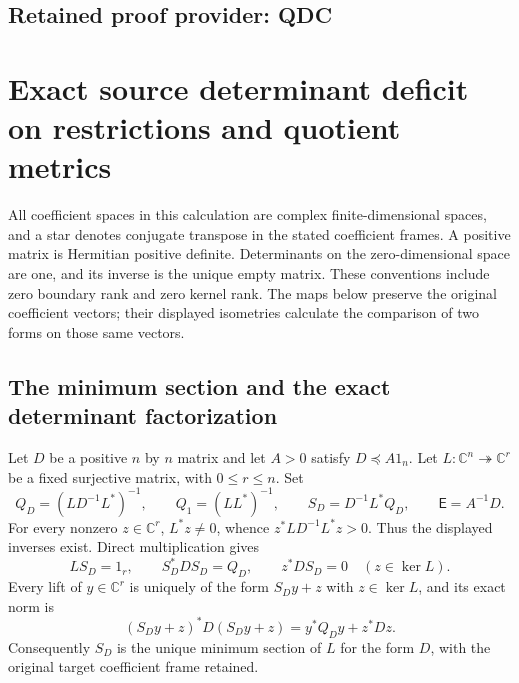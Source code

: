 \documentclass[11pt,a4paper]{article}
\begin{document}
\clearpage
\subsection*{Retained proof provider: QDC}

\section{Exact source determinant deficit on restrictions and quotient metrics}

All coefficient spaces in this calculation are complex finite-dimensional
spaces, and a star denotes conjugate transpose in the stated coefficient
frames. A positive matrix is Hermitian positive definite. Determinants on
the zero-dimensional space are one, and its inverse is the unique empty
matrix. These conventions include zero boundary rank and zero kernel rank.
The maps below preserve the original coefficient vectors; their displayed
isometries calculate the comparison of two forms on those same vectors.

\subsection{The minimum section and the exact determinant factorization}

Let $D$ be a positive $n$ by $n$ matrix and let $A>0$ satisfy
$D\preceq A1_n$. Let
$L:\mathbb C^n\twoheadrightarrow\mathbb C^r$ be a fixed surjective
matrix, with $0\le r\le n$. Set
\[
 Q_D=(LD^{-1}L^*)^{-1},\qquad Q_1=(LL^*)^{-1},\qquad
 S_D=D^{-1}L^*Q_D,\qquad \mathsf E=A^{-1}D .
 \tag{QDC1}
\]
For every nonzero $z\in\mathbb C^r$, $L^*z\ne0$, whence
$z^*LD^{-1}L^*z>0$. Thus the displayed inverses exist.
Direct multiplication gives
\[
 LS_D=1_r,\qquad S_D^*DS_D=Q_D,\qquad
 z^*DS_D=0\quad(z\in\ker L).
 \tag{QDC2}
\]
Every lift of $y\in\mathbb C^r$ is uniquely of the form $S_Dy+z$
with $z\in\ker L$, and its exact norm is
\[
 (S_Dy+z)^*D(S_Dy+z)=y^*Q_Dy+z^*Dz.
 \tag{QDC3}
\]
Consequently $S_D$ is the unique minimum section of $L$ for the
form $D$, with the original target coefficient frame retained.
\end{document}
